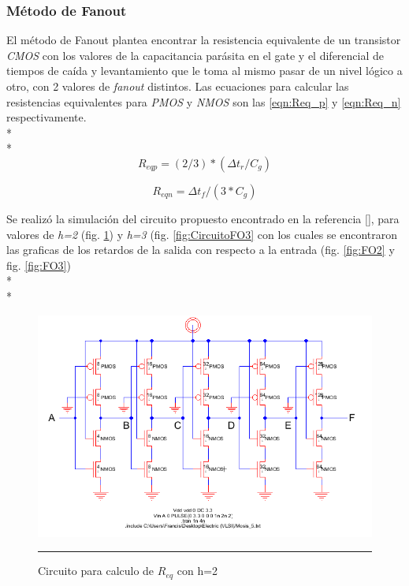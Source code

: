 \documentclass[12pt,a4paper]{article} %
\begin{document}
\subsubsection{Método de Fanout}

El método de Fanout plantea encontrar la resistencia equivalente de un transistor \textit{CMOS} con los valores de la capacitancia parásita en el gate y el diferencial de tiempos de caída y levantamiento que le toma al mismo pasar de un nivel lógico a otro, con 2 valores de \textit{fanout} distintos. Las ecuaciones para calcular las resistencias equivalentes para \textit{PMOS} y \textit{NMOS} son las \ref{eqn:Req_p} y \ref{eqn:Req_n} respectivamente.\\*
\\*
\begin{equation}\label{eqn:Req_p}
R_{eqp}=(2/3)*( \Delta t_{r}/C_{g})
\end{equation}

\begin{equation}\label{eqn:Req_n}
R_{eqn}= \Delta t_{f}/(3*C_{g})
\end{equation}

Se realizó la simulación del circuito propuesto encontrado en la referencia [], para valores de \textit{h=2} (fig. \ref{fig:CircuitoFO2}) y \textit{h=3} (fig. \ref{fig:CircuitoFO3} con los cuales se encontraron las graficas de los retardos de la salida con respecto a la entrada (fig. \ref{fig:FO2} y fig. \ref{fig:FO3})\\*
\\*
\begin{figure}[htbp]
\begin{center}
    \includegraphics[scale=0.5]{./CircuitoFO2.png}
    \rule{35em}{0.5pt}
  \caption[Captura]{Circuito para calculo de $R_{eq}$ con h=2}
  \label{fig:CircuitoFO2}
  \end{center}
\end{figure}
\end{document}
